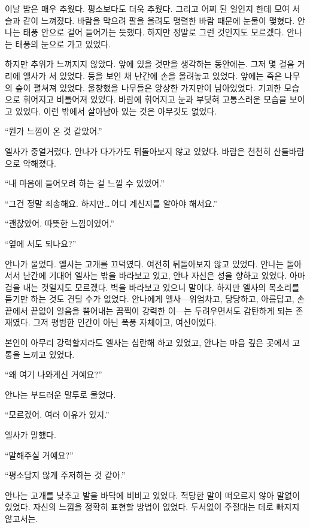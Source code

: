 \textbreak

이날 밤은 매우 추웠다. 평소보다도 더욱 추웠다. 그리고 어찌 된 일인지 한데 모여 서슬과 같이 느껴졌다. 바람을 막으려 팔을 올려도 맹렬한 바람 때문에 눈물이 맺혔다. 안나는 태풍 안으로 걸어 들어가는 듯했다. 하지만 정말로 그런 것인지도 모르겠다. 안나는 태풍의 눈으로 가고 있었다.

하지만 추위가 느껴지지 않았다. 앞에 있을 것만을 생각하는 동안에는. 그저 몇 걸음 거리에 엘사가 서 있었다. 등을 보인 채 난간에 손을 올려놓고 있었다. 앞에는 죽은 나무의 숲이 펼쳐져 있었다. 울창했을 나무들은 앙상한 가지만이 남아있었다. 기괴한 모습으로 휘어지고 비틀어져 있었다. 바람에 휘어지고 눈과 부딪혀 고통스러운 모습을 보이고 있었다. 이런 밖에서 살아남아 있는 것은 아무것도 없었다.

``뭔가 느낌이 온 것 같았어.''

엘사가 중얼거렸다. 안나가 다가가도 뒤돌아보지 않고 있었다. 바람은 천천히 산들바람으로 약해졌다.

``내 마음에 들어오려 하는 걸 느낄 수 있었어.''

``그건 정말 죄송해요. 하지만\ldots\,어디 계신지를 알아야 해서요.''

``괜찮았어. 따뜻한 느낌이었어.''

``옆에 서도 되나요?''

안나가 물었다. 엘사는 고개를 끄덕였다. 여전히 뒤돌아보지 않고 있었다. 안나는 돌아서서 난간에 기대어 엘사는 밖을 바라보고 있고, 안나 자신은 성을 향하고 있었다. 아마 겁을 내는 것일지도 모르겠다. 벽을 바라보고 있으니 말이다. 하지만 엘사의 목소리를 듣기만 하는 것도 견딜 수가 없었다. 안나에게 엘사—위엄차고, 당당하고, 아름답고, 손끝에서 끝없이 얼음을 뿜어내는 끔찍이 강력한 이—는 두려우면서도 감탄하게 되는 존재였다. 그저 평범한 인간이 아닌 폭풍 자체이고, 여신이었다.

본인이 아무리 강력할지라도 엘사는 심란해 하고 있었고, 안나는 마음 깊은 곳에서 고통을 느끼고 있었다.

``왜 여기 나와계신 거예요?''

안나는 부드러운 말투로 물었다.

``모르겠어. 여러 이유가 있지.''

엘사가 말했다.

``말해주실 거예요?''

``평소답지 않게 주저하는 것 같아.''

안나는 고개를 낮추고 발을 바닥에 비비고 있었다. 적당한 말이 떠오르지 않아 말없이 있었다. 자신의 느낌을 정확히 표현할 방법이 없었다. 두서없이 주절대는 데로 빠지지 않고서는.

